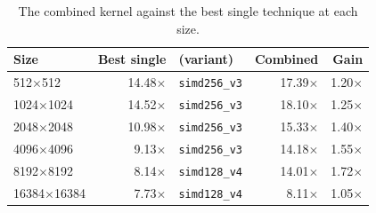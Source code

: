 \begin{table}[htbp]
\centering\small
\caption{The combined kernel against the best single technique at each size.}
\label{tab:combined-synergy}
\begin{tabular}{lrlrr}
\toprule
Size & Best single & (variant) & Combined & Gain \\
\midrule
512$\times$512 & 14.48$\times$ & \texttt{simd256_v3} & 17.39$\times$ & 1.20$\times$ \\
1024$\times$1024 & 14.52$\times$ & \texttt{simd256_v3} & 18.10$\times$ & 1.25$\times$ \\
2048$\times$2048 & 10.98$\times$ & \texttt{simd256_v3} & 15.33$\times$ & 1.40$\times$ \\
4096$\times$4096 & 9.13$\times$ & \texttt{simd256_v3} & 14.18$\times$ & 1.55$\times$ \\
8192$\times$8192 & 8.14$\times$ & \texttt{simd128_v4} & 14.01$\times$ & 1.72$\times$ \\
16384$\times$16384 & 7.73$\times$ & \texttt{simd128_v4} & 8.11$\times$ & 1.05$\times$ \\
\bottomrule
\end{tabular}
\end{table}

